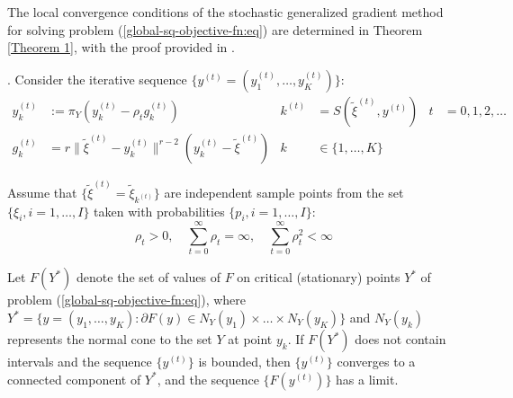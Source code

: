 The local convergence conditions of the stochastic generalized gradient method for solving problem (\ref{global-sq-objective-fn:eq}) are determined in Theorem \ref{Theorem 1}, with the proof provided in \cite{Ermoliev_Norkin_2003,Ermolev_Norkin_1998}.
\begin{theorem}
    \label{Theorem 1} \cite{Ermoliev_Norkin_2003,Ermolev_Norkin_1998}. Consider the iterative sequence $ \{ y^{(t)} = (y_1^{(t)}, \ldots, y_K^{(t)}) \} $:
    \begin{align}
        \label{sq-iter:eq}
            y_k^{(t)} &:= \pi_Y (y_k^{(t)} - \rho_t g_k^{(t)}) & k^{(t)} &= S(\tilde{\xi}^{(t)}, y^{(t)}) & t &= 0, 1, 2, \ldots \nonumber \\
            g_k^{(t)} &= r \| \tilde{\xi}^{(t)} - y_k^{(t)} \|^{r - 2} (y_k^{(t)} - \tilde{\xi}^{(t)}) & k &\in \{ 1, \ldots, K \}
    \end{align}

    Assume that $ \{ \tilde{\xi}^{(t)} = \tilde{\xi}_{k^{(t)}} \} $ are independent sample points from the set $ \{ \xi_i, i = 1, \ldots, I \} $ taken with probabilities $ \{ p_i, i = 1, \ldots, I \} $:
    \begin{equation}
        \label{sq-convergence-cond:eq}
            \rho_t > 0, \quad \sum_{t=0}^{\infty} \rho_t = \infty, \quad \sum_{t=0}^{\infty} \rho_t^2 < \infty
    \end{equation}

    Let $ F(Y^*) $ denote the set of values of $ F $ on critical (stationary) points $ Y^* $ of problem (\ref{global-sq-objective-fn:eq}), where $ Y^* = \{ y = (y_1, \ldots, y_K): \partial F(y) \in N_Y (y_1) \times \ldots \times N_Y (y_K) \} $ and $ N_Y (y_k) $ represents the normal cone to the set $ Y $ at point $ y_k $. If $ F(Y^*) $ does not contain intervals and the sequence $ \{ y^{(t)} \} $ is bounded, then $ \{ y^{(t)} \} $ converges to a connected component of $ Y^* $, and the sequence $ \{ F(y^{(t)}) \} $ has a limit.
\end{theorem}


